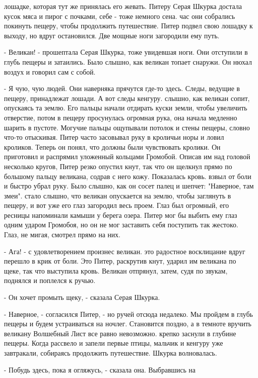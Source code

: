 лошадке, которая тут же принялась его жевать. Питеру Серая Шкурка 
достала кусок мяса и пирог с почками, себе - тоже немного сена.
 час они собрались покинуть пещеру, чтобы продолжить 
путешествие. Питер подвел свою лошадку к выходу, но вдруг остановился. 
Две мощные ноги загородили ему путь.
\par- Великан! - прошептала Серая Шкурка, тоже увидевшая ноги. Они 
отступили в глубь пещеры и затаились. Было слышно, как великан топает 
снаружи. Он нюхал воздух и говорил сам с собой.
\par- Я чую, чую людей. Они наверняка прячутся где-то здесь. Следы, 
ведущие в пещеру, принадлежат лошади. А вот следы кенгуру.
 слышно, как великан сопит, опускаясь та землю. Его пальцы 
начали отдирать куски земли, чтобы увеличить отверстие, потом в пещеру 
просунулась огромная рука, она начала медленно шарить в пустоте. 
Могучие пальцы ощупывали потолок и стены пещеры, словно что-то 
отыскивая.
 Питер часто засовывал руку в кроличьи норы и ловил 
кроликов. Теперь он понял, что должны были чувствовать кролики. Он 
приготовил и распрямил уложенный кольцами Громобой. Описав им над 
головой несколько кругов, Питер резко опустил кнут, так что он щелкнул 
прямо по большому пальцу великана, содрав с него кожу. Показалась 
кровь.
 взвыл от боли и быстро убрал руку. Было слышно, как он 
сосет палец и шепчет: "Наверное, там змеи".
 стало слышно, что великан опускается на землю, чтобы 
заглянуть в пещеру, и вот уже его глаз загородил весь проем. Глаз был 
огромный, его ресницы напоминали камыши у берега озера. Питер мог бы 
выбить ему глаз одним ударом Громобоя, но он не мог заставить себя 
поступить так жестоко. Глаз, не мигая, смотрел прямо на них.
\par- Ага! - с удовлетворением произнес великан.
 это радостное восклицание вдруг перешло в крик от боли. Это 
Питер, раскрутив кнут, ударил им великана по щеке, так что выступила 
кровь. Великан отпрянул, затем, судя по звукам, поднялся и поплелся к 
ручью.
\par- Он хочет промыть щеку, - сказала Серая Шкурка.
\par- Наверное, - согласился Питер, - но ручей отсюда недалеко. Мы 
пройдем в глубь пещеры и будем устраиваться на ночлег. Становится 
поздно, а в темноте вручить великану Волшебный Лист все равно 
невозможно.
 крепко заснули в глубине пещеры. Когда рассвело и запели 
первые птицы, мальчик и кенгуру уже завтракали, собираясь продолжить 
путешествие.
 Шкурка волновалась.
\par- Побудь здесь, пока я огляжусь, - сказала она. Выбравшись на 
